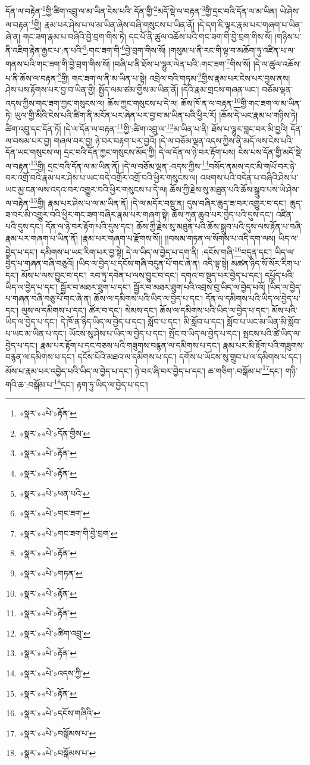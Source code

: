 དོན་ལ་བརྟེན་\footnote{«སྣར་»«པེ་»རྟོན་}གྱི་ཚིག་འབྲུ་ལ་མ་ཡིན་ངེས་པའི་:དོན་གྱི་\footnote{«སྣར་»«པེ་»དོན་གྱིས་}མདོ་སྡེ་ལ་བརྟན་\footnote{«སྣར་»«པེ་»རྟོན་}གྱི་དྲང་བའི་དོན་ལ་མ་ཡིན། ཡེ་ཤེས་ལ་བརྟན་\footnote{«སྣར་»«པེ་»རྟོན་}གྱི། རྣམ་པར་ཤེས་པ་ལ་མ་ཡིན་ཞེས་བཞི་གསུངས་པ་ཡིན་ནོ། །དེ་དག་ཇི་ལྟར་རྣམ་པར་གཞག་པ་ཡིན་ཞེ་ན། གང་ཟག་རྣམ་པ་བཞིའི་བྱེ་བྲག་གིས་ཏེ། དང་པོ་ནི་ཚུལ་འཆོས་པའི་གང་ཟག་གི་བྱེ་བྲག་གིས་སོ། །གཉིས་པ་ནི་འཇིག་རྟེན་རྒྱང་པ་:ན་པའི་\footnote{«སྣར་»«པེ་»ཕན་པའི་}:གང་ཟག་གི་\footnote{«སྣར་»«པེ་»གང་ཟག་}བྱེ་བྲག་གིས་སོ། །གསུམ་པ་ནི་རང་གི་ལྟ་བ་མཆོག་ཏུ་འཛིན་པ་ལ་གནས་པའི་གང་ཟག་གི་བྱེ་བྲག་གིས་སོ། །བཞི་པ་ནི་ཐོས་པ་ལྷུར་ལེན་པའི་:གང་ཟག་\footnote{«སྣར་»«པེ་»གང་ཟག་གི་བྱེ་བྲག་}གིས་སོ། །དེ་ལ་ཚུལ་འཆོས་པ་ནི་ཆོས་ལ་བརྟན་\footnote{«སྣར་»«པེ་»རྟོན་}གྱི། གང་ཟག་ལ་ནི་མ་ཡིན་པ་སྟེ། འབྲེལ་བའི་གཏམ་\footnote{«སྣར་»«པེ་»གཏན་}གྱིས་རྣམ་པར་ངེས་པར་བྱས་ནས། ཤེས་པས་རྟོགས་པར་བྱ་བ་ཡིན་གྱི། སྤྱོད་ལམ་ཙམ་གྱིས་མ་ཡིན་ནོ། །དེའི་རྣམ་གྲངས་གཞན་ཡང་། བཅོམ་ལྡན་འདས་ཀྱིས་གང་ཟག་ཀྱང་གསུངས་ལ། ཆོས་ཀྱང་གསུངས་པ་དེ་ལ། ཆོས་ཁོ་ན་ལ་བརྟན་\footnote{«སྣར་»«པེ་»རྟོན་}གྱི་གང་ཟག་ལ་མ་ཡིན་ཏེ། ཡུལ་གྱི་མིའི་ངེས་པའི་ཚིག་ནི་མངོན་པར་ཞེན་པར་བྱ་བ་མ་ཡིན་པའི་ཕྱིར་རོ། །ཆོས་དེ་ཡང་རྣམ་པ་གཉིས་ཏེ། ཚིག་འབྲུ་དང་དོན་ཏོ། །དེ་ལ་དོན་ལ་བརྟན་\footnote{«སྣར་»«པེ་»རྟོན་}གྱི་:ཚིག་འབྲུ་ལ་\footnote{«སྣར་»«པེ་»ཚིག་འབྲུ་}མ་ཡིན་པ་ནི། ཐོས་པ་ལྷུར་བླང་བར་མི་བྱའི། དོན་ལ་བསམ་པར་བྱ། གཞལ་བར་བྱ། ཉེ་བར་བརྟག་པར་བྱའོ། །དེ་ལ་བཅོམ་ལྡན་འདས་ཀྱིས་ནི་མདོ་ལས་ངེས་པའི་དོན་ཡང་གསུངས་ལ། དྲང་བའི་དོན་ཀྱང་གསུངས་མོད་ཀྱི། དེ་ལ་དོན་ལ་ཉེ་བར་རྟོག་པས། ངེས་པས་དོན་གྱི་མདོ་སྡེ་ལ་བརྟན་\footnote{«སྣར་»«པེ་»རྟོན་}གྱི། དྲང་བའི་དོན་ལ་མ་ཡིན་ནོ། །དེ་ལ་བཅོམ་ལྡན་:འདས་ཀྱིས་\footnote{«སྣར་»«པེ་»འདས་ཀྱི་}བསོད་ནམས་དང་མི་གཡོ་བར་ཉེ་བར་འགྲོ་བའི་རྣམ་པར་ཤེས་པ་ཡང་བདེ་འགྲོར་འགྲོ་བའི་ཕྱིར་གསུངས་ལ། འཕགས་པའི་བདེན་པ་བཞིའི་ཤེས་པ་ཡང་མྱ་ངན་ལས་འདའ་བར་འགྱུར་བའི་ཕྱིར་གསུངས་པ་དེ་ལ། ཆོས་ཀྱི་རྗེས་སུ་མཐུན་པའི་ཆོས་སྒྲུབ་པས་ཡེ་ཤེས་ལ་བརྟེན་\footnote{«སྣར་»«པེ་»རྟོན་}གྱི། རྣམ་པར་ཤེས་པ་ལ་མ་ཡིན་ནོ། །དེ་ལ་མདོར་བསྡུ་ན། དུས་བཞིར་ཆུད་ཟ་བར་འགྱུར་བ་དང་། ཆུད་ཟ་བར་མི་འགྱུར་བའི་ཕྱིར་གང་ཟག་བཞིར་རྣམ་པར་གཞག་སྟེ། ཆོས་ཀུན་ཆུབ་པར་བྱེད་པའི་དུས་དང་། འཛིན་པའི་དུས་དང་། དོན་ལ་ཉེ་བར་རྟོག་པའི་དུས་དང་། ཆོས་ཀྱི་རྗེས་སུ་མཐུན་པའི་ཆོས་སྒྲུབ་པའི་དུས་ལས་རྟོན་པ་བཞི་རྣམ་པར་གཞག་པ་ཡིན་ནོ། །རྣམ་པར་གཞག་པ་རྫོགས་སོ།། །།བསམ་གཏན་ལ་སོགས་པ་འདི་དག་ལས། ཡིད་ལ་བྱེད་པ་དང་། དམིགས་པ་ཡང་རིག་པར་བྱ་སྟེ། དེ་ལ་ཡིད་ལ་བྱེད་པ་དག་ནི། :དངོས་གཞི་\footnote{«སྣར་»«པེ་»དངོས་གཞིའི་}བདུན་དང་། ཡིད་ལ་བྱེད་པ་གཞན་བཞི་བཅུའོ། །ཡིད་ལ་བྱེད་པ་དངོས་གཞི་བདུན་པོ་གང་ཞེ་ན། འདི་ལྟ་སྟེ། མཚན་ཉིད་སོ་སོར་རིག་པ་དང་། མོས་པ་ལས་བྱུང་བ་དང་། རབ་ཏུ་དབེན་པ་ལས་བྱུང་བ་དང་། དགའ་བ་སྡུད་པར་བྱེད་པ་དང་། དཔྱོད་པའི་ཡིད་ལ་བྱེད་པ་དང་། སྦྱོར་བ་མཐར་ཐུག་པ་དང་། སྦྱོར་བ་མཐར་ཐུག་པའི་འབྲས་བུ་ཡིད་ལ་བྱེད་པའོ། །ཡིད་ལ་བྱེད་པ་གཞན་བཞི་བཅུ་པོ་གང་ཞེ་ན། ཆོས་ལ་དམིགས་པའི་ཡིད་ལ་བྱེད་པ་དང་། དོན་ལ་དམིགས་པའི་ཡིད་ལ་བྱེད་པ་དང་། ལུས་ལ་དམིགས་པ་དང་། ཚོར་བ་དང་། སེམས་དང་། ཆོས་ལ་དམིགས་པའི་ཡིད་ལ་བྱེད་པ་དང་། མོས་པའི་ཡིད་ལ་བྱེད་པ་དང་། དེ་ཁོ་ན་ཉིད་ཡིད་ལ་བྱེད་པ་དང་། སློབ་པ་དང་། མི་སློབ་པ་དང་། སློབ་པ་ཡང་མ་ཡིན་མི་སློབ་པ་ཡང་མ་ཡིན་པ་དང་། ཡོངས་སུ་ཤེས་པ་ཡིད་ལ་བྱེད་པ་དང་། སྤོང་བ་ཡིད་ལ་བྱེད་པ་དང་། སྤངས་པའི་ཚེ་ཡིད་ལ་བྱེད་པ་དང་། རྣམ་པར་རྟོག་པ་དང་བཅས་པའི་གཟུགས་བརྙན་ལ་དམིགས་པ་དང་། རྣམ་པར་མི་རྟོག་པའི་གཟུགས་བརྙན་ལ་དམིགས་པ་དང་། དངོས་པོའི་མཐའ་ལ་དམིགས་པ་དང་། དགོས་པ་ཡོངས་སུ་གྲུབ་པ་ལ་དམིགས་པ་དང་། མོས་པ་རྣམ་པར་འབྱེད་པའི་ཡིད་ལ་བྱེད་པ་དང་། ཉེ་བར་ཞི་བར་བྱེད་པ་དང་། ཆ་གཅིག་:བསྒོམ་པ་\footnote{«སྣར་»«པེ་»བསྒོམས་པ་}དང་། གཉི་གའི་ཆ་:བསྒོམ་པ་\footnote{«སྣར་»«པེ་»བསྒོམས་པ་}དང་། རྟག་ཏུ་ཡིད་ལ་བྱེད་པ་དང་། 